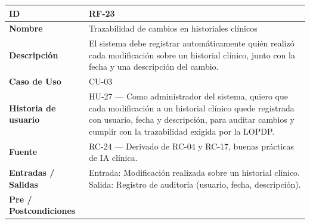 \documentclass[
]{article}
\newcounter{none} %
\begin{document}
{\def\LTcaptype{none} %
\begin{longtable}[]{|
  >{\raggedright\arraybackslash}p{}|
  >{\raggedright\arraybackslash}p{}|}
\hline
\begin{minipage}[b]{\linewidth}\raggedright
\textbf{ID}
\end{minipage} & \begin{minipage}[b]{\linewidth}\raggedright
RF-23
\end{minipage} \\
\hline
\endhead
\hline
\endlastfoot
\textbf{Nombre} & \begin{minipage}[t]{\linewidth}\raggedright
Trazabilidad de cambios en historiales clínicos
\end{minipage} \\
\hline
\textbf{Descripción} & \begin{minipage}[t]{\linewidth}\raggedright
El sistema debe registrar automáticamente quién realizó cada modificación sobre un historial clínico, junto con la fecha y una descripción del cambio.
\end{minipage} \\
\hline
\textbf{Caso de Uso} & \begin{minipage}[t]{\linewidth}\raggedright
CU-03
\end{minipage} \\
\hline
\textbf{Historia de usuario} & \begin{minipage}[t]{\linewidth}\raggedright
HU-27 — Como administrador del sistema, quiero que cada modificación a un historial clínico quede registrada con usuario, fecha y descripción, para auditar cambios y cumplir con la trazabilidad exigida por la LOPDP.
\end{minipage} \\
\hline
\textbf{Fuente} & \begin{minipage}[t]{\linewidth}\raggedright
RC-24 — Derivado de RC-04 y RC-17, buenas prácticas de IA clínica.
\end{minipage} \\
\hline
\textbf{Entradas / Salidas} & \begin{minipage}[t]{\linewidth}\raggedright
Entrada: Modificación realizada sobre un historial clínico. Salida: Registro de auditoría (usuario, fecha, descripción).
\end{minipage} \\
\hline
\textbf{Pre / Postcondiciones} & \begin{minipage}[t]{\linewidth}\raggedright

\end{minipage}
\end{longtable}}
\end{document}
